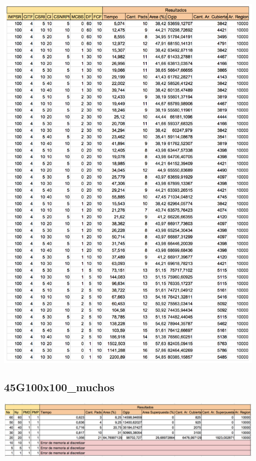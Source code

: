\begin{center}
\includegraphics[width=1\textwidth]{imagenes/45G100x100_pocos_V2}
\end{center}

\subsection{45G100x100\_muchos}

\begin{center}
\includegraphics[width=1\textwidth]{imagenes/S_45G100x100_muchos}
\end{center}

